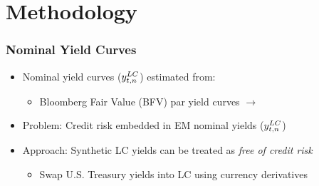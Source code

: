 \documentclass[12pt, aspectratio=169, xcolor=dvipsnames]{beamer}  %
\begin{document}
\section{Methodology}

\begin{frame}
	\frametitle{\textbf{Nominal} Yield Curves}
	\begin{itemize}
		\item Nominal yield curves ($y_{t,n} ^{LC}$) estimated from:
		\begin{itemize}
			\item Bloomberg Fair Value (BFV) par yield curves $\rightarrow$ \cite{NelsonSiegel:1987}
		\end{itemize}
		\item \alert{Problem:} Credit risk embedded in EM nominal yields ($y_{t,n} ^{LC}$)
		\item \alert{Approach:} Synthetic LC yields can be treated as \textit{free of credit risk}
		\begin{itemize}
			\item Swap U.S. Treasury yields into LC using \alert{currency derivatives}
		\end{itemize}
	\end{itemize}
\end{frame}
\end{document}
